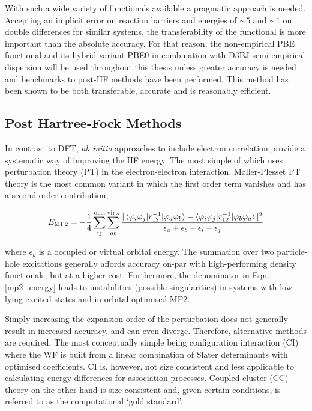 \documentclass[main.tex]{subfiles}
\begin{document}
With such a wide variety of functionals available a pragmatic approach is needed. Accepting an implicit error on reaction barriers and energies of $\sim 5$ \kcal\cite{Goerigk2011} and $\sim 1$ \kcalx on double differences for similar systems,\cite{Wheeler2009} the transferability of the functional is more important than the absolute accuracy. For that reason, the non-empirical PBE functional and its hybrid variant PBE0 in combination with D3BJ semi-empirical dispersion will be used throughout this thesis unless greater accuracy is needed and benchmarks to post-HF methods have been performed. This method has been shown to be both transferable, accurate and is reasonably efficient.\cite{Mardirossian2017}


\subsection{Post Hartree-Fock Methods}

In contrast to DFT, \emph{ab initio} approaches to include electron correlation provide a systematic way of improving the HF energy. The most simple of which uses perturbation theory (PT) in the electron-electron interaction. M{\o}ller-Plesset PT theory is the most common variant in which the first order term vanishes and has a second-order contribution,\cite{Cremer2011}

\begin{equation}
E_\text{MP2} = -\frac{1}{4} \sum_{ij}^\text{occ.}\sum_{ab}^\text{virt.}\frac{|\braket{\varphi_i \varphi_j |r_{12}^{-1}| \varphi_a \varphi_b} - \braket{\varphi_i \varphi_j |r_{12}^{-1}| \varphi_b \varphi_a}|^2}{\epsilon_a + \epsilon_b - \epsilon_i - \epsilon_j}
\label{mp2_energy}
\end{equation}

where $\epsilon_k$ is a occupied or virtual orbital energy. The summation over two particle-hole excitations generally affords accuracy on-par with high-performing density functionals,\cite{McKechnie2015, Smith2019} but at a higher cost. Furthermore, the denominator in Eqn. \eqref{mp2_energy} leads to instabilities (possible singularities) in systems with low-lying excited states and in orbital-optimised MP2.\cite{Lee2018}

Simply increasing the expansion order of the perturbation does not generally result in increased accuracy, and can even diverge.\cite{Forsberg2000} Therefore, alternative methods are required. The most conceptually simple being configuration interaction (CI) where the WF is built from a linear combination of Slater determinants with optimised coefficients. CI is, however, not size consistent and less applicable to calculating energy differences for association processes.\cite{Szalay2011} Coupled cluster (CC) theory on the other hand is size consistent and, given certain conditions, is referred to as the computational `gold standard'.\cite{ez2012} 
\end{document}
